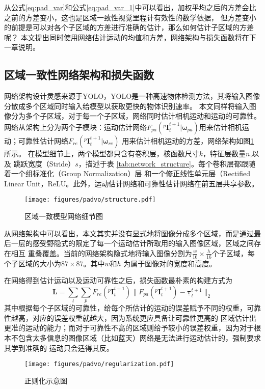 从公式\eqref{eq:pad_var}和公式\eqref{eq:pad_var_1}中可以看出，加权平均之后的方差会比之前的方差变小，这也是区域一致性视觉里程计有效性的数学依据，
但方差变小的前提是可以对各个子区域的方差进行准确的估计，那么如何估计子区域的方差呢？
本文提出同时使用网络估计运动的均值和方差，网络架构与损失函数将在下一章说明。



\subsection{区域一致性网络架构和损失函数}
\label{sec:padvo_stru_loss}

网络架构设计灵感来源于YOLO\cite{redmon2016you}，YOLO是一种高速物体检测方法，其将输入图像分散成多个区域同时输入给模型以获取更快的物体识别速率。
本文同样将输入图像分为多个子区域，对于每一个子区域，网络同时估计相机运动和运动的可靠性。网络从架构上分为两个子模块：运动估计网络$F_{pa}(^p\mathbf{I}_t^{t+1}|\mathbf{\omega}_{pa})$用来估计相机运动；可靠性估计网络$F_{re}(^p\mathbf{I}_t^{t+1}|\mathbf{\omega}_{re})$
用来估计相机运动的方差，网络架构如图\ref{fig:structure}所示。 在模型细节上，两个模型都只含有卷积层，核函数尺寸$k$，特征层数量$n$,以及
跳跃宽度（Stride）$s$，描述于表 \ref{tab:network_structure}。每个卷积层都跟随着一个组标准化（Group Normalization）层
和一个修正线性单元层（Rectified Linear Unit，ReLU。此外，运动估计网络和可靠性估计网络在前五层共享参数。
\begin{figure}[t]
  \centering
  \texttt{[image: figures/padvo/structure.pdf]}
  \caption{区域一致模型网络细节图}
  \label{fig:structure}
\end{figure}

从网络架构中可以看出，本文其实并没有显式地将图像分成多个区域，而是通过最后一层的感受野隐式的限定了每一个运动估计所取用的输入图像区域，区域之间存在相互
重叠覆盖。当前的网络架构隐式地将输入图像分割为$\frac{w}{16}\times\frac{h}{16}$个子区域，每个子区域的大小为$87\times87$。其中$w$和$h$
为属于图像对的宽度和高度。

在网络得到估计运动以及运动可靠性之后，损失函数最朴素的构建方式为
\begin{equation}
    \mathbf{L} = \sum_t \sum_p {F_{re}\left(^p\mathbf{I}_t^{t+1}\right)}\|F_{pa}\left(^p\mathbf{I}_t^{t+1}\right)-\mathbf{\underline{\tau}}_t^{t+1}\|_2
\end{equation}
其中根据每个子区域的可靠性，给每个所估计的运动的误差赋予不同的权重，可靠性越高，对应的误差权重就越大，因为系统更应具备让可靠性更高的
区域估计出更准的运动的能力；而对于可靠性不高的区域则给予较小的误差权重，因为对于根本不包含太多信息的图像区域（比如蓝天）网络是无法进行运动估计的，强制要求其学到准确的
运动只会适得其反。
\begin{figure}[h]
  \centering
  \texttt{[image: figures/padvo/regularization.pdf]}
  \caption{正则化示意图}
  \label{fig:regularization}
\end{figure}

